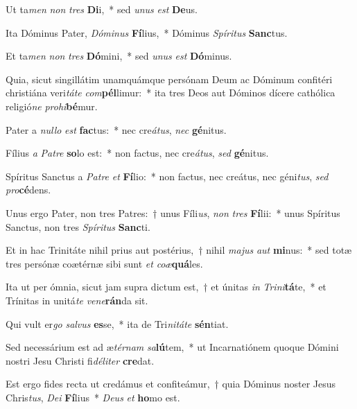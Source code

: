 \item Ut ta\textit{men} \textit{non} \textit{tres} \textbf{Di}i,~* sed \textit{u}\textit{nus} \textit{est} \textbf{De}us.
\item Ita Dóminus Pater, \textit{Dó}\textit{mi}\textit{nus} \textbf{Fí}lius,~* Dóminus \textit{Spí}\textit{ri}\textit{tus} \textbf{Sanc}tus.
\item Et ta\textit{men} \textit{non} \textit{tres} \textbf{Dó}mini,~* sed \textit{u}\textit{nus} \textit{est} \textbf{Dó}minus.
\item Quia, sicut singillátim unamquámque persónam Deum ac Dóminum confitéri christiána veri\textit{tá}\textit{te} \textit{com}\textbf{pél}limur:~* ita tres Deos aut Dóminos dícere cathólica religió\textit{ne} \textit{pro}\textit{hi}\textbf{bé}mur.
\item Pater a \textit{nul}\textit{lo} \textit{est} \textbf{fac}tus:~* nec cre\textit{á}\textit{tus}, \textit{nec} \textbf{gé}nitus.
\item Fílius \textit{a} \textit{Pa}\textit{tre} \textbf{so}lo est:~* non factus, nec cre\textit{á}\textit{tus}, \textit{sed} \textbf{gé}nitus.
\item Spíritus Sanctus a \textit{Pa}\textit{tre} \textit{et} \textbf{Fí}lio:~* non factus, nec creátus, nec géni\textit{tus}, \textit{sed} \textit{pro}\textbf{cé}dens.
\item Unus ergo Pater, non tres Patres:~† unus Fíli\textit{us}, \textit{non} \textit{tres} \textbf{Fí}lii:~* unus Spíritus Sanctus, non tres \textit{Spí}\textit{ri}\textit{tus} \textbf{Sanc}ti.
\item Et in hac Trinitáte nihil prius aut postérius,~† nihil \textit{ma}\textit{jus} \textit{aut} \textbf{mi}nus:~* sed totæ tres persónæ coætérnæ sibi sunt \textit{et} \textit{co}\textit{æ}\textbf{quá}les.
\item Ita ut per ómnia, sicut jam supra dictum est,~† et únitas \textit{in} \textit{Tri}\textit{ni}\textbf{tá}te,~* et Trínitas in unitá\textit{te} \textit{ve}\textit{ne}\textbf{rán}da sit.
\item Qui vult er\textit{go} \textit{sal}\textit{vus} \textbf{es}se,~* ita de Tri\textit{ni}\textit{tá}\textit{te} \textbf{sén}tiat.
\item Sed necessárium est ad æ\textit{tér}\textit{nam} \textit{sa}\textbf{lú}tem,~* ut Incarnatiónem quoque Dómini nostri Jesu Christi fi\textit{dé}\textit{li}\textit{ter} \textbf{cre}dat.
\item Est ergo fides recta ut credámus et confiteámur,~† quia Dóminus noster Jesus Chris\textit{tus}, \textit{De}\textit{i} \textbf{Fí}lius~* \textit{De}\textit{us} \textit{et} \textbf{ho}mo est.
